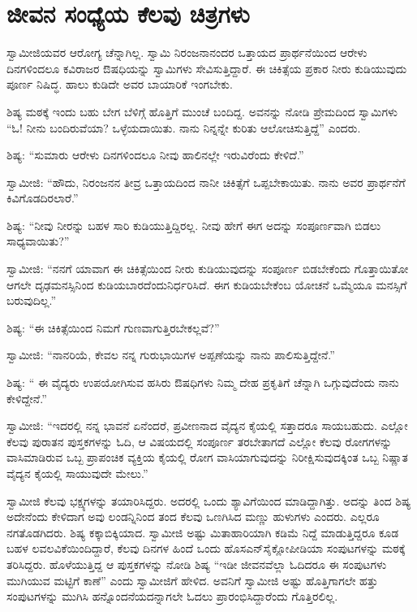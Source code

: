 
\chapter{ಜೀವನ ಸಂಧ್ಯೆಯ ಕೆಲವು ಚಿತ್ರಗಳು}

 ಸ್ವಾಮೀಜಿಯವರ ಆರೋಗ್ಯ ಚೆನ್ನಾಗಿಲ್ಲ. ಸ್ವಾಮಿ ನಿರಂಜನಾನಂದರ ಒತ್ತಾಯದ ಪ್ರಾರ್ಥನೆಯಿಂದ ಆರೇಳು ದಿನಗಳಿಂದಲೂ ಕವಿರಾಜರ ಔಷಧಿಯನ್ನು ಸ್ವಾಮಿಗಳು ಸೇವಿಸುತ್ತಿದ್ದಾರೆ. ಈ ಚಿಕಿತ್ಸೆಯ ಪ್ರಕಾರ ನೀರು ಕುಡಿಯುವುದು ಪೂರ್ಣ ನಿಷಿದ್ಧ. ಹಾಲು ಕುಡಿದೇ ಅವರ ಬಾಯಾರಿಕೆ ಇಂಗಬೇಕು. 

 ಶಿಷ್ಯ ಮಠಕ್ಕೆ ಇಂದು ಬಹು ಬೇಗ ಬೆಳಿಗ್ಗೆ ಹೊತ್ತಿಗೆ ಮುಂಚೆ ಬಂದಿದ್ದ. ಅವನನ್ನು ನೋಡಿ ಪ್ರೇಮದಿಂದ ಸ್ವಾಮಿಗಳು “ಓ!‌ ನೀನು ಬಂದಿರುವೆಯಾ? ಒಳ್ಳೆಯದಾಯಿತು. ನಾನು ನಿನ್ನನ್ನೇ ಕುರಿತು ಆಲೋಚಿಸುತ್ತಿದ್ದೆ” ಎಂದರು. 

 ಶಿಷ್ಯ: “ಸುಮಾರು ಆರೇಳು ದಿನಗಳಿಂದಲೂ ನೀವು ಹಾಲಿನಲ್ಲೇ ಇರುವಿರೆಂದು ಕೇಳಿದೆ.” 

 ಸ್ವಾಮೀಜಿ: “ಹೌದು, ನಿರಂಜನನ ತೀವ್ರ ಒತ್ತಾಯದಿಂದ ನಾನೀ ಚಿಕಿತ್ಸೆಗೆ ಒಪ್ಪಬೇಕಾಯಿತು. ನಾನು ಅವರ ಪ್ರಾರ್ಥನೆಗೆ ಕಿವಿಗೊಡದಿರಲಾರೆ.” 

 ಶಿಷ್ಯ: “ನೀವು ನೀರನ್ನು ಬಹಳ ಸಾರಿ ಕುಡಿಯುತ್ತಿದ್ದಿರಲ್ಲ. ನೀವು ಹೇಗೆ ಈಗ ಅದನ್ನು ಸಂಪೂರ್ಣವಾಗಿ ಬಿಡಲು ಸಾಧ್ಯವಾಯಿತು?” 

 ಸ್ವಾಮೀಜಿ: “ನನಗೆ ಯಾವಾಗ ಈ ಚಿಕಿತ್ಸೆಯಿಂದ ನೀರು ಕುಡಿಯುವುದನ್ನು ಸಂಪೂರ್ಣ ಬಿಡಬೇಕೆಂದು ಗೊತ್ತಾಯಿತೋ ಆಗಲೇ ದೃಢಮನಸ್ಸಿನಿಂದ ಕುಡಿಯಬಾರದೆಂದು\break ನಿರ್ಧರಿಸಿದೆ. ಈಗ ಕುಡಿಯಬೇಕೆಂಬ ಯೋಚನೆ ಒಮ್ಮೆಯೂ ಮನಸ್ಸಿಗೆ ಬರುವುದಿಲ್ಲ.” 

 ಶಿಷ್ಯ: “ಈ ಚಿಕಿತ್ಸೆಯಿಂದ ನಿಮಗೆ ಗುಣವಾಗುತ್ತಿರಬೇಕಲ್ಲವೆ?” 

 ಸ್ವಾಮೀಜಿ: “ನಾನರಿಯೆ, ಕೇವಲ ನನ್ನ ಗುರುಭಾಯಿಗಳ ಅಪ್ಪಣೆಯನ್ನು ನಾನು ಪಾಲಿಸುತ್ತಿದ್ದೇನೆ.” 

 ಶಿಷ್ಯ: “ ಈ ವೈದ್ಯರು ಉಪಯೋಗಿಸುವ ಹಸಿರು ಔಷಧಿಗಳು ನಿಮ್ಮ ದೇಹ ಪ್ರಕೃತಿಗೆ ಚೆನ್ನಾಗಿ ಒಗ್ಗುವುದೆಂದು ನಾನು ಕೇಳಿದ್ದೇನೆ.” 

 ಸ್ವಾಮೀಜಿ: “ಇದರಲ್ಲಿ ನನ್ನ ಭಾವನೆ ಏನೆಂದರೆ, ಪ್ರವೀಣನಾದ ವೈದ್ಯನ ಕೈಯಲ್ಲಿ ಸತ್ತಾದರೂ ಸಾಯಬಹುದು. ಎಲ್ಲೋ ಕೆಲವು ಪುರಾತನ ಪುಸ್ತಕಗಳನ್ನು ಓದಿ, ಆ ವಿಷಯದಲ್ಲಿ ಸಂಪೂರ್ಣ ತರಬೇತಾಗದೆ ಎಲ್ಲೋ ಕೆಲವು ರೋಗಗಳನ್ನು ವಾಸಿಮಾಡಿರುವ ಒಬ್ಬ ಪ್ರಾಪಂಚಿಕ ವ್ಯಕ್ತಿಯ ಕೈಯಲ್ಲಿ ರೋಗ ವಾಸಿಯಾಗುವುದನ್ನು ನಿರೀಕ್ಷಿಸುವುದಕ್ಕಿಂತ ಒಬ್ಬ ನಿಷ್ಣಾತ ವೈದ್ಯನ ಕೈಯಲ್ಲಿ ಸಾಯುವುದೇ ಮೇಲು.” 

 ಸ್ವಾಮೀಜಿ ಕೆಲವು ಭಕ್ಷ್ಯಗಳನ್ನು ತಯಾರಿಸಿದ್ದರು. ಅದರಲ್ಲಿ ಒಂದು ಶ್ಯಾವಿಗೆಯಿಂದ ಮಾಡಿದ್ದಾಗಿತ್ತು. ಅದನ್ನು ತಿಂದ ಶಿಷ್ಯ ಅದೇನೆಂದು ಕೇಳಿದಾಗ ಅವು ಲಂಡನ್ನಿನಿಂದ ತಂದ ಕೆಲವು ಒಣಗಿಸಿದ ಮಣ್ಣು ಹುಳುಗಳು ಎಂದರು. ಎಲ್ಲರೂ ನಗತೊಡಗಿದರು. ಶಿಷ್ಯ ಕಕ್ಕಾಬಿಕ್ಕಿಯಾದ. ಸ್ವಾಮೀಜಿ ಅಷ್ಟು ಮಿತಾಹಾರಿಯಾಗಿ ಕಡಿಮೆ ನಿದ್ದೆ ಮಾಡುತ್ತಿದ್ದರೂ ಕೂಡ ಬಹಳ ಲವಲವಿಕೆಯಿಂದಿದ್ದಾರೆ, ಕೆಲವು ದಿನಗಳ ಹಿಂದೆ ಒಂದು ಹೊಸ\break ಎನ್‌ಸೈಕ್ಲೋಪೀಡಿಯಾ ಸಂಪುಟಗಳನ್ನು ಮಠಕ್ಕೆ ತರಿಸಿದ್ದರು. ಹೊಳೆಯುತ್ತಿದ್ದ ಆ ಪುಸ್ತಕಗಳನ್ನು ನೋಡಿ ಶಿಷ್ಯ “ಇಡೀ ಜೀವನವೆಲ್ಲಾ ಓದಿದರೂ ಈ ಸಂಪುಟಗಳು ಮುಗಿಯುವ ಮಟ್ಟಿಗೆ ಕಾಣೆ” ಎಂದು ಸ್ವಾಮೀಜಿಗೆ ಹೇಳಿದ. ಅವನಿಗೆ ಸ್ವಾಮೀಜಿ ಅಷ್ಟು ಹೊತ್ತಿಗಾಗಲೇ ಹತ್ತು ಸಂಪುಟಗಳನ್ನು ಮುಗಿಸಿ ಹನ್ನೊಂದನೆಯದನ್ನಾಗಲೇ ಓದಲು ಪ್ರಾರಂಭಿಸಿದ್ದಾರೆಂದು ಗೊತ್ತಿರಲಿಲ್ಲ. 

